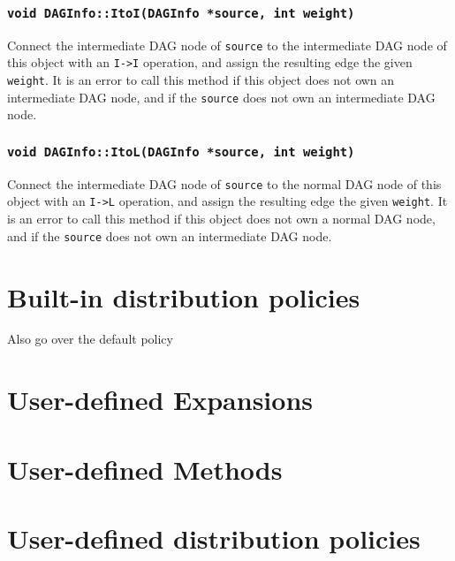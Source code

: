 \subsubsection{\texttt{void DAGInfo::ItoI(DAGInfo *source, int weight)}}

Connect the intermediate DAG node of \texttt{source} to the intermediate DAG
node of this object with an \texttt{I->I} operation, and assign the resulting
edge the given \texttt{weight}. It is an error to call this method if this
object does not own an intermediate DAG node, and if the \texttt{source} does
not own an intermediate DAG node.

\subsubsection{\texttt{void DAGInfo::ItoL(DAGInfo *source, int weight)}}

Connect the intermediate DAG node of \texttt{source} to the normal DAG
node of this object with an \texttt{I->L} operation, and assign the resulting
edge the given \texttt{weight}. It is an error to call this method if this
object does not own a normal DAG node, and if the \texttt{source} does
not own an intermediate DAG node.


\section{Built-in distribution policies}

Also go over the default policy



\section{User-defined Expansions}



\section{User-defined Methods}



\section{User-defined distribution policies}
